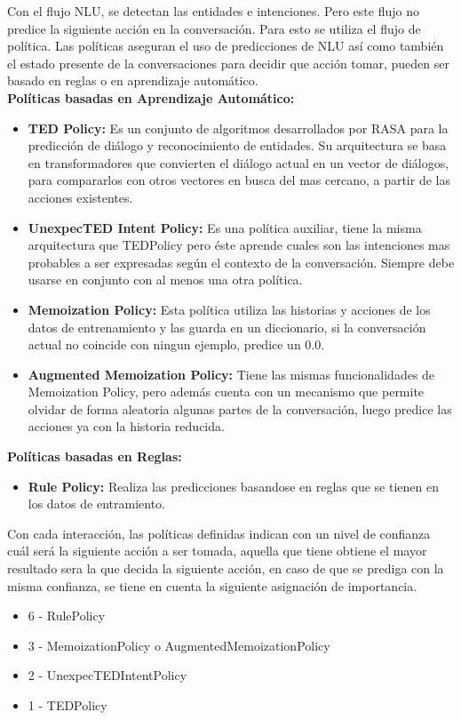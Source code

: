 Con el flujo NLU, se detectan las entidades e intenciones. Pero este flujo no predice la siguiente
acción en la
conversación. Para esto se utiliza el flujo de política. Las políticas aseguran el uso de
predicciones de NLU así como
también el estado presente de la conversaciones para decidir que acción tomar, pueden ser basado en
reglas o en aprendizaje automático.\\
\textbf{Políticas basadas en Aprendizaje Automático:}
\begin{itemize}
	\item \textbf{TED Policy:}
	      Es un conjunto de algoritmos desarrollados por RASA para la predicción de diálogo y
	      reconocimiento de entidades. Su arquitectura se basa en transformadores que convierten el diálogo
	      actual en un vector de diálogos, para compararlos con otros vectores en busca del mas cercano, a
	      partir de las acciones existentes.\cite{ConversationalAIwithRasa}
	\item \textbf{UnexpecTED Intent Policy:} Es una política auxiliar, tiene la misma arquitectura
	      que TEDPolicy pero éste aprende cuales son las intenciones mas probables a ser expresadas según el
	      contexto de la conversación. Siempre debe usarse en conjunto con al menos una otra
	      política.\cite{UnexpecTED}
	\item \textbf{Memoization Policy: }Esta política utiliza las historias y acciones de los datos
	      de entrenamiento y las guarda en un diccionario, si la conversación actual no coincide con ningun
	      ejemplo, predice un 0.0.\cite{MemoizationPolicy}
	\item \textbf{Augmented Memoization Policy: } Tiene las mismas funcionalidades de Memoization
	      Policy, pero además cuenta con un mecanismo que permite olvidar de forma aleatoria algunas partes
	      de la conversación, luego predice las acciones ya con la historia
	      reducida.\cite{AugmentedMemoizationPolicy}
\end{itemize}
\textbf{Políticas basadas en Reglas:}
\begin{itemize}
	\item \textbf{Rule Policy:} Realiza las predicciones basandose en reglas que se tienen en los
	      datos de entramiento.
\end{itemize}
Con cada interacción, las políticas definidas indican con un nivel de confianza cuál será la
siguiente acción a ser tomada, aquella que tiene obtiene el mayor resultado sera la que decida la
siguiente acción, en caso de que se prediga con la misma confianza, se tiene en cuenta la siguiente
asignación de importancia.
\begin{itemize}
	\item 6 - RulePolicy
	\item 3 - MemoizationPolicy o AugmentedMemoizationPolicy
	\item 2 -  UnexpecTEDIntentPolicy
	\item 1 - TEDPolicy
\end{itemize}

